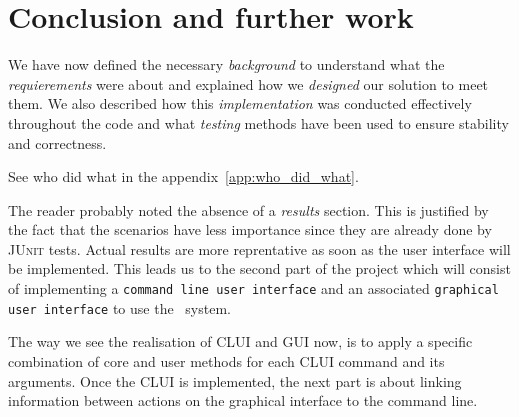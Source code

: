 \section{Conclusion and further work} %
\label{sec:conclusion}
We have now defined the necessary \emph{background} to understand
what the \emph{requierements} were about and explained how we \emph{designed} 
our solution to meet them. We also described how this 
\emph{implementation} was conducted effectively throughout the code
and what \emph{testing} methods have been used to ensure stability
and correctness.

See who did what in the appendix~\ref{app:who_did_what}.


The reader probably noted the absence of a \emph{results} section.
This is justified by the fact that the scenarios have less importance
since they are already done by \textsc{JUnit} tests. Actual results are more
reprentative as soon as the
user interface will be implemented.
This leads us to the second part of the project which will
consist of implementing a \texttt{command line user interface} and 
an associated \texttt{graphical user interface} to use the \MyFoodora~system.

The way we see the realisation of CLUI and GUI now, is to apply a specific combination of core and user methods for each CLUI command and its arguments.
Once the CLUI is implemented, the next part is about linking
information between actions on the graphical interface to the command line.


